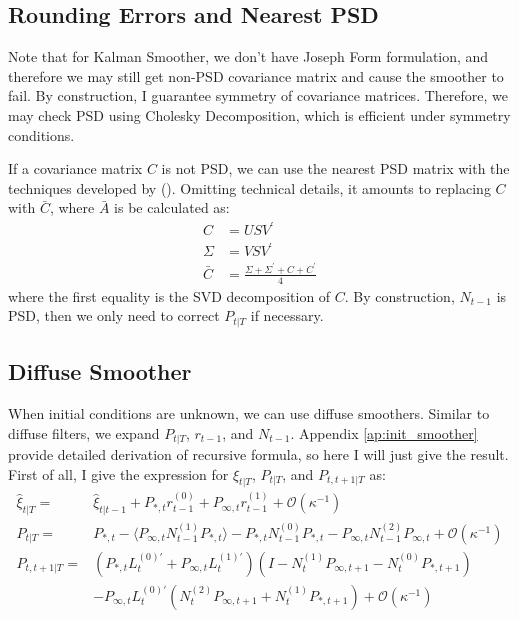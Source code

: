 \documentclass[10pt, titlepage]{article}
\numberwithin{equation}{section}
\begin{document}
\subsection{Rounding Errors and Nearest PSD}
Note that for Kalman Smoother, we don't have Joseph Form formulation, and therefore we may still get non-PSD covariance matrix and cause the smoother to fail. By construction, I guarantee symmetry of covariance matrices. Therefore, we may check PSD using Cholesky Decomposition, which is efficient under symmetry conditions.

If a covariance matrix $C$ is not PSD, we can use the nearest PSD matrix with the techniques developed by (\cite{higham_1988}). Omitting technical details, it amounts to replacing $C$ with $\bar{C}$, where $\bar{A}$ is be calculated as:
\begin{align*}
    C &= USV^{'} \\
    \Sigma &= VSV^{'} \\
    \bar{C} &= \frac{\Sigma + \Sigma^{'} + C + C^{'}}{4}
\end{align*}
where the first equality is the SVD decomposition of $C$. By construction, $N_{t-1}$ is PSD, then we only need to correct $P_{t|T}$ if necessary. 

\subsection{Diffuse Smoother}
When initial conditions are unknown, we can use diffuse smoothers. Similar to diffuse filters, we expand $P_{t|T}$, $r_{t-1}$, and $N_{t-1}$. Appendix \ref{ap:init_smoother} provide detailed derivation of recursive formula, so here I will just give the result. First of all, I give the expression for $\hat{\xi}_{t|T}$, $P_{t|T}$, and $P_{t,t+1|T}$ as:
\begin{align}
    \hat{\xi}_{t|T} =& \hat{\xi}_{t|t-1} + P_{*,t}r_{t-1}^{(0)}+P_{\infty,t}r_{t-1}^{(1)}+\mathcal{O}(\kappa^{-1}) \label{eq:diff_xi} \\
    P_{t|T} =& P_{*,t} - \langle P_{\infty,t}N_{t-1}^{(1)}P_{*,t}\rangle - P_{*,t}N_{t-1}^{(0)}P_{*,t} 
        - P_{\infty,t}N_{t-1}^{(2)}P_{\infty,t} + \mathcal{O}(\kappa^{-1}) \label{eq:diff_P} \\
    P_{t,t+1|T} =& (P_{*,t}L_t^{(0)'}+P_{\infty,t}L_t^{(1)'})(I-N_t^{(1)}P_{\infty,t+1}-N_t^{(0)}P_{*,t+1}) \nonumber \\
    &- P_{\infty,t}L_t^{(0)'}(N_t^{(2)}P_{\infty,t+1}+N_t^{(1)}P_{*,t+1}) + \mathcal{O}(\kappa^{-1}) \label{eq:diff_Pcov}
\end{align}
\end{document}

